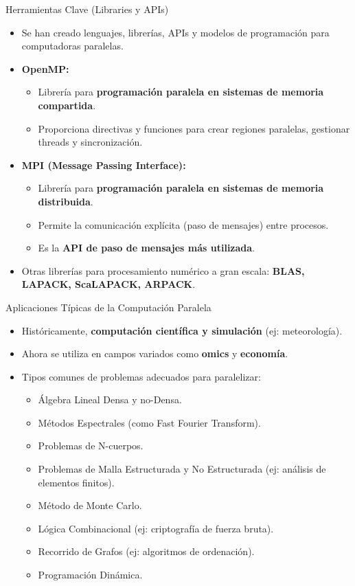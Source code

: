 \begin{frame}{Herramientas Clave (Libraries y APIs)}
  \begin{itemize}
    \item Se han creado lenguajes, librerías, APIs y modelos de programación para computadoras paralelas.
    \item \textbf{OpenMP:}
    \begin{itemize}
      \item Librería para \textbf{programación paralela en sistemas de memoria compartida}.
      \item Proporciona directivas y funciones para crear regiones paralelas, gestionar threads y sincronización.
    \end{itemize}
    \item \textbf{MPI (Message Passing Interface):}
    \begin{itemize}
      \item Librería para \textbf{programación paralela en sistemas de memoria distribuida}.
      \item Permite la comunicación explícita (paso de mensajes) entre procesos.
      \item Es la \textbf{API de paso de mensajes más utilizada}.
    \end{itemize}
    \item Otras librerías para procesamiento numérico a gran escala: \textbf{BLAS, LAPACK, ScaLAPACK, ARPACK}.
  \end{itemize}
\end{frame}

\begin{frame}{Aplicaciones Típicas de la Computación Paralela}
  \begin{itemize}
    \item Históricamente, \textbf{computación científica y simulación} (ej: meteorología).
    \item Ahora se utiliza en campos variados como \textbf{omics} y \textbf{economía}.
    \item Tipos comunes de problemas adecuados para paralelizar:
    \begin{itemize}
        \item Álgebra Lineal Densa y no-Densa.
      \item Métodos Espectrales (como Fast Fourier Transform).
      \item Problemas de N-cuerpos.
      \item Problemas de Malla Estructurada y No Estructurada (ej: análisis de elementos finitos).
      \item Método de Monte Carlo.
      \item Lógica Combinacional (ej: criptografía de fuerza bruta).
      \item Recorrido de Grafos (ej: algoritmos de ordenación).
      \item Programación Dinámica.
    \end{itemize}
  \end{itemize}
\end{frame}

